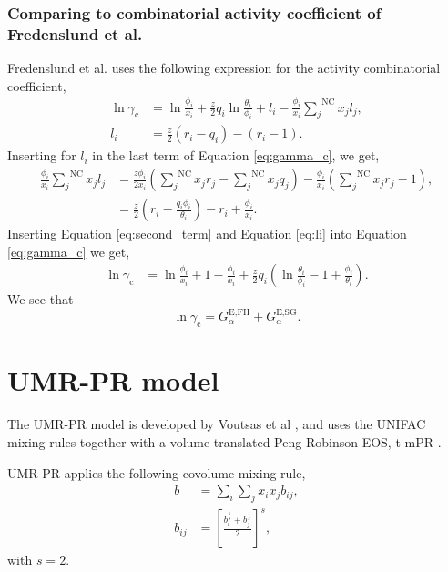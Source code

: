 \documentclass[internal,english]{sintefmemo2012}
\newcommand*{\ousum}[2]{\overset{#1}{\underset{#2}{\sum}}}
\newcommand{\excess}{\text{E}\xspace}
\newcommand{\FH}{\text{FH}\xspace}
\newcommand{\SG}{\text{SG}\xspace}
\newcommand{\NC}{\text{NC}\xspace}
\begin{document}
\subsubsection{Comparing to combinatorial activity coefficient of Fredenslund et al.}
Fredenslund et al. \cite{Fredenslund1975} uses the following expression for the activity combinatorial coefficient,
\begin{align}
  \ln \gamma_{\text{c}} &= \ln \frac{\phi_i}{x_i} + \frac{z}{2} q_i \ln \frac{\theta_i}{\phi_i} + l_i - \frac{\phi_i}{x_i}\ousum{\NC}{j} x_j l_j , \label{eq:gamma_c} \\
  l_i &= \frac{z}{2} \left(r_i - q_i\right) - \left(r_i - 1\right) . \label{eq:li}
\end{align}
Inserting for $l_i$ in the last term of Equation \ref{eq:gamma_c}, we get,
\begin{align}
  \frac{\phi_i}{x_i}\ousum{\NC}{j} x_j l_j &= \frac{z\phi_i}{2x_i}\left(\ousum{\NC}{j} x_j r_j - \ousum{\NC}{j}x_jq_j\right) - \frac{\phi_i}{x_i}\left(\ousum{\NC}{j} x_j r_j - 1\right), \\
  &= \frac{z}{2}\left(r_i - \frac{q_i\phi_i}{\theta_i}\right) - r_i + \frac{\phi_i}{x_i}. \label{eq:second_term}
\end{align}
Inserting Equation \ref{eq:second_term} and Equation \ref{eq:li} into Equation \ref{eq:gamma_c} we get,
\begin{align}
  \ln \gamma_{\text{c}} &= \ln \frac{\phi_i}{x_i} + 1 - \frac{\phi_i}{x_i} + \frac{z}{2} q_i \left(\ln \frac{\theta_i}{\phi_i} -1 + \frac{\phi_i}{\theta_i}\right).
\end{align}
We see that
\begin{equation}
  \ln \gamma_{\text{c}} = G^{\excess,\FH}_\alpha + G^{\excess,\SG}_\alpha.
\end{equation}
\section{UMR-PR model}
The UMR-PR model is developed by Voutsas et al \cite{Voutsas2004}, and
uses the UNIFAC mixing rules together with a volume translated
Peng-Robinson EOS, t-mPR \cite{Avlonitis1994}.

UMR-PR applies the following covolume mixing rule,
\begin{align}
  b &= \underset{i}{\sum} \underset{j}{\sum} x_i x_j b_{ij},\\
  b_{ij} &= \left[\frac{b_i^{\frac{1}{s}} + b_j^{\frac{1}{s}}}{2}\right]^s,
  \label{eq:bij}
\end{align}
with $s=2$.
\end{document}
